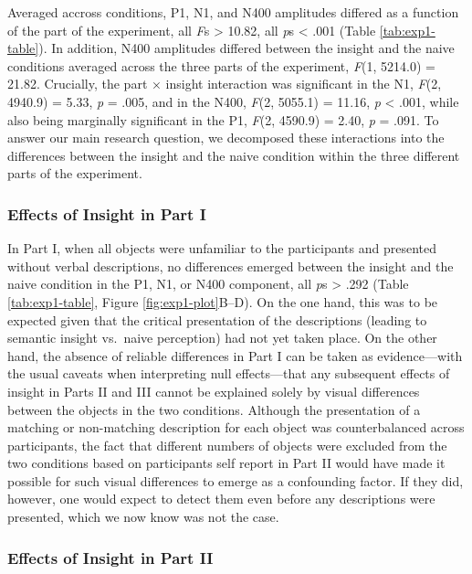 \documentclass[
  english,
  man,11pt,floatsintext]{apa7}
\begin{document}
Averaged accross conditions, P1, N1, and N400 amplitudes differed as a function of the part of the experiment, all \emph{F}s \textgreater{} 10.82, all \emph{p}s \textless{} .001 (Table \ref{tab:exp1-table}). In addition, N400 amplitudes differed between the insight and the naive conditions averaged across the three parts of the experiment, \emph{F}(1, 5214.0) = 21.82. Crucially, the part × insight interaction was significant in the N1, \emph{F}(2, 4940.9) = 5.33, \emph{p} = .005, and in the N400, \emph{F}(2, 5055.1) = 11.16, \emph{p} \textless{} .001, while also being marginally significant in the P1, \emph{F}(2, 4590.9) = 2.40, \emph{p} = .091. To answer our main research question, we decomposed these interactions into the differences between the insight and the naive condition within the three different parts of the experiment.

\hypertarget{effects-of-insight-in-part-i}{%
\subsubsection{Effects of Insight in Part I}\label{effects-of-insight-in-part-i}}

In Part I, when all objects were unfamiliar to the participants and presented without verbal descriptions, no differences emerged between the insight and the naive condition in the P1, N1, or N400 component, all \emph{p}s \textgreater{} .292 (Table \ref{tab:exp1-table}, Figure \ref{fig:exp1-plot}B--D). On the one hand, this was to be expected given that the critical presentation of the descriptions (leading to semantic insight vs.~naive perception) had not yet taken place. On the other hand, the absence of reliable differences in Part I can be taken as evidence---with the usual caveats when interpreting null effects---that any subsequent effects of insight in Parts II and III cannot be explained solely by visual differences between the objects in the two conditions. Although the presentation of a matching or non-matching description for each object was counterbalanced across participants, the fact that different numbers of objects were excluded from the two conditions based on participants self report in Part II would have made it possible for such visual differences to emerge as a confounding factor. If they did, however, one would expect to detect them even before any descriptions were presented, which we now know was not the case.

\hypertarget{effects-of-insight-in-part-ii}{%
\subsubsection{Effects of Insight in Part II}\label{effects-of-insight-in-part-ii}}
\end{document}
